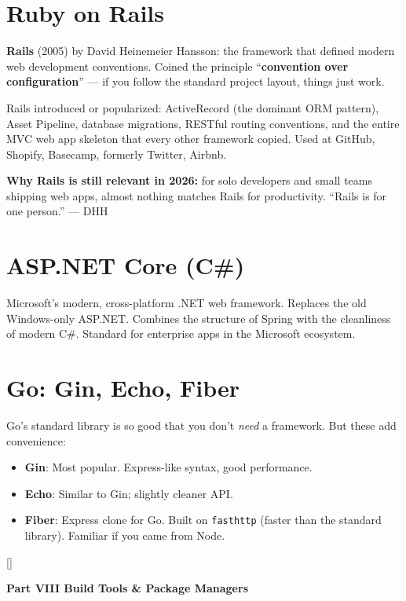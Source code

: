 \documentclass[11pt, letterpaper]{article}
\newcommand{\greysections}{%
  \titleformat{\section}{\large\bfseries\color{sectiongrey}}{}{0em}{}[\color{sectiongrey}\titlerule]%
  \titleformat{\subsection}{\normalsize\bfseries\color{sectiongrey!80!black}}{}{0em}{}%
}
\newcommand{\partbanner}[3]{%
  \begin{tcolorbox}[colback=#1, colframe=#2, boxrule=1.2pt, arc=4pt,
    left=8pt, right=8pt, top=6pt, bottom=6pt]
    \begin{center}{\LARGE\bfseries #3}\end{center}
  \end{tcolorbox}%
}
\begin{document}
\section*{Ruby on Rails}

\textbf{Rails} (2005) by David Heinemeier Hansson: the framework that defined modern web development conventions. Coined the principle ``\textbf{convention over configuration}'' --- if you follow the standard project layout, things just work.

Rails introduced or popularized: ActiveRecord (the dominant ORM pattern), Asset Pipeline, database migrations, RESTful routing conventions, and the entire MVC web app skeleton that every other framework copied. Used at GitHub, Shopify, Basecamp, formerly Twitter, Airbnb.

\textbf{Why Rails is still relevant in 2026:} for solo developers and small teams shipping web apps, almost nothing matches Rails for productivity. ``Rails is for one person.'' --- DHH

\section*{ASP.NET Core (C\#)}

Microsoft's modern, cross-platform .NET web framework. Replaces the old Windows-only ASP.NET. Combines the structure of Spring with the cleanliness of modern C\#. Standard for enterprise apps in the Microsoft ecosystem.

\section*{Go: Gin, Echo, Fiber}

Go's standard library is so good that you don't \emph{need} a framework. But these add convenience:
\begin{itemize}[noitemsep]
  \item \textbf{Gin}: Most popular. Express-like syntax, good performance.
  \item \textbf{Echo}: Similar to Gin; slightly cleaner API.
  \item \textbf{Fiber}: Express clone for Go. Built on \texttt{fasthttp} (faster than the standard library). Familiar if you came from Node.
\end{itemize}

\newpage

\greysections
{}
\partbanner{part7bg}{sectiongrey}{Part VIII \quad Build Tools \& Package Managers}
\end{document}
